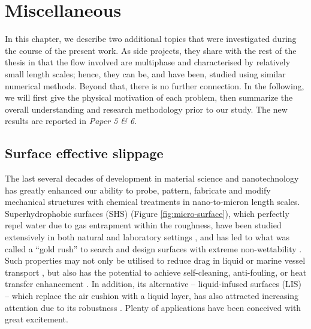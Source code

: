 \chapter{Miscellaneous}  \label{chp:misc}


In this chapter, we describe two additional topics that were investigated during the course of the present work.
As side projects, they share with the rest of the thesis in that the flow involved are multiphase and characterised by relatively small length scales; hence, they can be, and have been, studied using similar numerical methods.
Beyond that, there is no further connection.
In the following, we will first give the physical motivation of each problem, then summarize the overall understanding and research methodology prior to our study.
The new results are reported in \emph{Paper 5 \& 6}.


\section{Surface effective slippage}

The last several decades of development in material science and nanotechnology has greatly enhanced our ability to probe, pattern, fabricate and modify mechanical structures with chemical treatments in nano-to-micron length scales.
Superhydrophobic surfaces (SHS) (Figure \ref{fig:micro-surface}), which perfectly repel water due to gas entrapment within the roughness, have been studied extensively in both natural and laboratory settings \citep{plant_superhydro_1997, Onda_etal_1996}, and has led to what was called a ``gold rush'' to search and design surfaces with extreme non-wettability \citep{Bocquet}.
Such properties may not only be utilised to reduce drag in liquid or marine vessel transport \citep{Watanabe, Ou, Choi_Kim, Lee}, but also has the potential to achieve self-cleaning, anti-fouling, or heat transfer enhancement \citep{Blossey2003, Roach_etal_2008}.
In addition, its alternative -- liquid-infused surfaces (LIS) -- which replace the air cushion with a liquid layer, has also attracted increasing attention due to its robustness \citep{Solomon, Rosenberg, Wexler}.
Plenty of applications have been conceived with great excitement.

